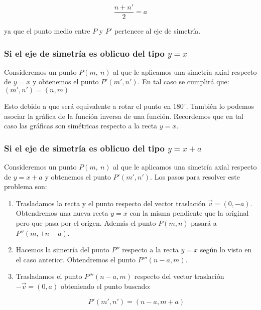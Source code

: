\[\dfrac{n +n'}{2} = a \]

ya que el punto medio entre $P$ y $P'$ pertenece al eje de simetría.

\subsubsection{Si el eje de simetría es oblicuo del tipo $y = x$}
Consideremos un punto $P(m,~n)$ al que le aplicamos una simetría axial respecto de $y = x$ y obtenemos el punto $P'(m', n')$. En tal caso se cumplirá que: $(m', n') = (n, m)$

Esto debido a que será equivalente a rotar el punto en $180^\circ$. También lo podemos asociar la gráfica de la función inversa de una función. Recordemos que en tal caso las gráficas son simétricas respecto a la recta $y = x$.

\subsubsection{Si el eje de simetría es oblicuo del tipo $y = x + a$}
Consideremos un punto $P(m,~n)$ al que le aplicamos una simetría axial respecto de $y = x + a$ y obtenemos el punto $P'(m',n')$. Los pasos para resolver este problema son:

\begin{enumerate}
	\item Trasladamos la recta y el punto respecto del vector traslación $\vec{v} = (0, - a)$. Obtendremos una nueva recta $y = x$ con la misma pendiente que la original pero que pasa por el origen. Además el punto $P(m,n)$ pasará a $P''(m, +n - a)$.
	\item Hacemos la simetría del punto $P''$ respecto a la recta $y = x$ según lo visto en el caso anterior. Obtendremos el punto $P'''(n-a, m)$.
	\item Trasladamos el punto $P'''(n-a, m)$ respecto del vector traslación $-\vec{v} = (0, a)$ obteniendo el punto buscado: 
	
	\[P'(m', n') = (n - a, m + a)\]
\end{enumerate} 

